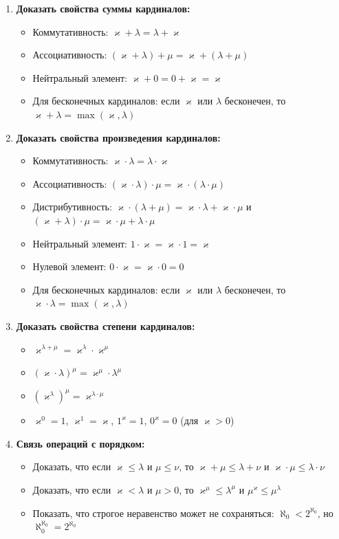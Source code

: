 \documentclass[11pt, a4paper]{extarticle}
\newcommand{\la}{\lambda}
\newcommand{\ka}{\varkappa}
\renewcommand{\le}{\leqslant}
\begin{document}
\begin{exercise}
\begin{enumerate}
    \item \textbf{Доказать свойства суммы кардиналов:}
    \begin{itemize}
        \item Коммутативность: $\ka + \la = \la + \ka$
        \item Ассоциативность: $(\ka + \la) + \mu = \ka + (\la + \mu)$
        \item Нейтральный элемент: $\ka + 0 = 0 + \ka = \ka$
        \item Для бесконечных кардиналов: если $\ka$ или $\la$ бесконечен, то $\ka + \la = \max(\ka, \la)$
    \end{itemize}
    
    \item \textbf{Доказать свойства произведения кардиналов:}
    \begin{itemize}
        \item Коммутативность: $\ka \cdot \la = \la \cdot \ka$
        \item Ассоциативность: $(\ka \cdot \la) \cdot \mu = \ka \cdot (\la \cdot \mu)$
        \item Дистрибутивность: $\ka \cdot (\la + \mu) = \ka \cdot \la + \ka \cdot \mu$ и $(\ka + \la) \cdot \mu = \ka \cdot \mu + \la \cdot \mu$
        \item Нейтральный элемент: $1 \cdot \ka = \ka \cdot 1 = \ka$
        \item Нулевой элемент: $0 \cdot \ka = \ka \cdot 0 = 0$
        \item Для бесконечных кардиналов: если $\ka$ или $\la$ бесконечен, то $\ka \cdot \la = \max(\ka, \la)$
    \end{itemize}
    
    \item \textbf{Доказать свойства степени кардиналов:}
    \begin{itemize}
        \item $\ka^{\la + \mu} = \ka^{\la} \cdot \ka^{\mu}$
        \item $(\ka \cdot \la)^{\mu} = \ka^{\mu} \cdot \la^{\mu}$
        \item $(\ka^{\la})^{\mu} = \ka^{\la \cdot \mu}$
        \item $\ka^0 = 1$, $\ka^1 = \ka$, $1^{\ka} = 1$, $0^{\ka} = 0$ (для $\ka > 0$)
    \end{itemize}
    
    \item \textbf{Связь операций с порядком:}
    \begin{itemize}
        \item Доказать, что если $\ka \le \la$ и $\mu \le \nu$, то $\ka + \mu \le \la + \nu$ и $\ka \cdot \mu \le \la \cdot \nu$
        \item Доказать, что если $\ka < \la$ и $\mu > 0$, то $\ka^{\mu} \le \la^{\mu}$ и $\mu^{\ka} \le \mu^{\la}$
        \item Показать, что строгое неравенство может не сохраняться: $\aleph_0 < 2^{\aleph_0}$, но $\aleph_0^{\aleph_0} = 2^{\aleph_0}$
    \end{itemize}
    

\end{enumerate}
\end{exercise}
\end{document}
